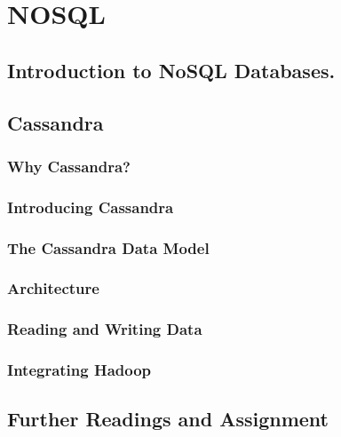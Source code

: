\section{NOSQL}
\subsection{Introduction to NoSQL Databases.}
\subsection{Cassandra}
\subsubsection{Why Cassandra?}
\subsubsection{Introducing Cassandra}
\subsubsection{The Cassandra Data Model}
\subsubsection{Architecture}
\subsubsection{Reading and Writing Data}
\subsubsection{Integrating Hadoop}
\subsection{Further Readings and Assignment}
